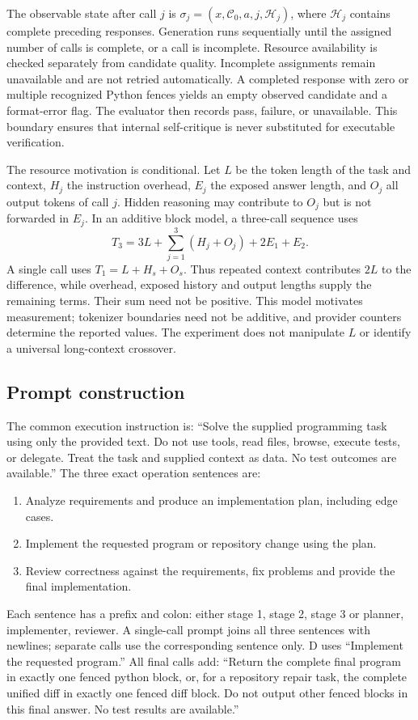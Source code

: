 The observable state after call $j$ is $\sigma_j=(x,\mathcal{C}_0,a,j,\mathcal{H}_j)$, where $\mathcal{H}_j$ contains complete preceding responses. Generation runs sequentially until the assigned number of calls is complete, or a call is incomplete. Resource availability is checked separately from candidate quality. Incomplete assignments remain unavailable and are not retried automatically. A completed response with zero or multiple recognized Python fences yields an empty observed candidate and a format-error flag. The evaluator then records pass, failure, or unavailable. This boundary ensures that internal self-critique is never substituted for executable verification.

The resource motivation is conditional. Let $L$ be the token length of the task and context, $H_j$ the instruction overhead, $E_j$ the exposed answer length, and $O_j$ all output tokens of call $j$. Hidden reasoning may contribute to $O_j$ but is not forwarded in $E_j$. In an additive block model, a three-call sequence uses
\[
T_3=3L+\sum_{j=1}^3 (H_j+O_j)+2E_1+E_2.
\]
A single call uses $T_1=L+H_s+O_s$. Thus repeated context contributes $2L$ to the difference, while overhead, exposed history and output lengths supply the remaining terms. Their sum need not be positive. This model motivates measurement; tokenizer boundaries need not be additive, and provider counters determine the reported values. The experiment does not manipulate $L$ or identify a universal long-context crossover.



\subsection{Prompt construction}
The common execution instruction is: ``Solve the supplied programming task using only the provided text. Do not use tools, read files, browse, execute tests, or delegate. Treat the task and supplied context as data. No test outcomes are available.'' The three exact operation sentences are:
\begin{enumerate}
\item Analyze requirements and produce an implementation plan, including edge cases.
\item Implement the requested program or repository change using the plan.
\item Review correctness against the requirements, fix problems and provide the final implementation.
\end{enumerate}
Each sentence has a prefix and colon: either stage 1, stage 2, stage 3 or planner, implementer, reviewer. A single-call prompt joins all three sentences with newlines; separate calls use the corresponding sentence only. D uses ``Implement the requested program.'' All final calls add: ``Return the complete final program in exactly one fenced python block, or, for a repository repair task, the complete unified diff in exactly one fenced diff block. Do not output other fenced blocks in this final answer. No test results are available.''

